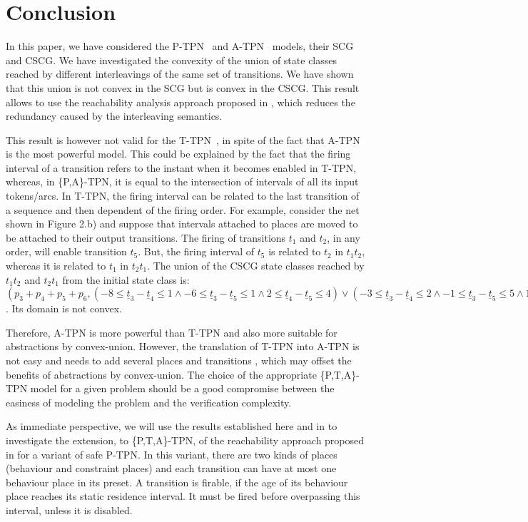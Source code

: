 \documentclass[submission,copyright,creativecommons]{eptcs}
\numberwithin{equation}{section}
\def\tapn{A-TPN}
\def\tppn{P-TPN}
\def\ttpn{T-TPN}
\begin{document}
\section{Conclusion}
\noindent In this paper, we have considered the \tppn~ and \tapn~
models, their SCG and CSCG. We have investigated the convexity of the union of state classes
reached by different interleavings of the same set of transitions.
We have shown that this union is not convex in the SCG but is convex in the CSCG. This result
allows to use the reachability analysis approach proposed in \cite{Maler06}, which reduces the redundancy caused by the interleaving semantics.
\par This result is however not valid for the \ttpn~\cite{infinity08}, in spite of the fact that A-TPN is the most powerful model. This could be explained by the fact that the firing interval of a transition refers to the instant when it becomes enabled in \ttpn, whereas, in \{P,A\}-TPN, it is equal to the intersection of intervals of all its input tokens/arcs. In T-TPN, the firing interval can be related to the last transition of a sequence and then dependent of the firing order. For example, consider the net shown in Figure 2.b) and suppose that intervals attached to places are moved to be attached to their output transitions. The firing of transitions $t_1$ and $t_2$, in any order, will enable transition $t_5$. But, the firing interval of $t_5$ is related to $t_2$ in $t_1t_2$, whereas it is related to $t_1$ in $t_2t_1$. The union of the CSCG state classes reached by $t_1t_2$ and $t_2t_1$ from the initial state class is: $(p_3+p_4+p_5+p_6, (-8 \leq \underline{t}_3- \underline{t}_4 \leq 1 \wedge  -6 \leq \underline{t}_3 - \underline{t}_5 \leq 1 \wedge  2 \leq \underline{t}_4 - \underline{t}_5 \leq 4 ) \vee (-3 \leq \underline{t}_3- \underline{t}_4 \leq 2 \wedge  -1 \leq \underline{t}_3- \underline{t}_5 \leq 5 \wedge  1 \leq \underline{t}_4 - \underline{t}_5 \leq 4 ))$.  Its domain is not convex.
\par Therefore, A-TPN is more powerful than T-TPN and also more suitable for abstractions by convex-union. However, the translation of T-TPN into A-TPN is not easy and needs to add several places and transitions \cite{boyer-FI-08}, which may offset the benefits of abstractions by convex-union. The choice of the appropriate \{P,T,A\}-TPN model for a given problem should be a good compromise between the easiness of modeling the problem and the verification complexity.
\par As immediate perspective, we will use the results established here and in \cite{infinity08} to investigate the extension, to \{P,T,A\}-TPN, of the reachability approach proposed in \cite{Myers} for a variant of safe P-TPN. In this variant, there are two kinds of places (behaviour and constraint places) and each transition can have at most one behaviour place in its preset. A transition is firable, if the age of its behaviour place reaches its static residence interval. It must be fired before overpassing this interval, unless it is disabled.
\end{document}
